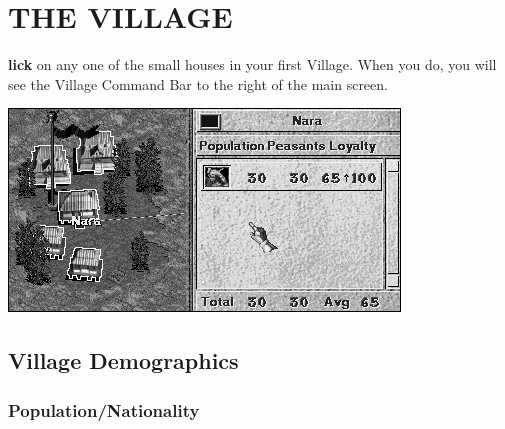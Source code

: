 
\chapter{\textsf{THE VILLAGE}}

\textbf{lick} on any one of the small houses in your first Village. When you do, you will see the Village Command Bar to the right of the main screen.

\begin{center}
    \includegraphics[width=0.9\linewidth]{Ivillage} %
\end{center}

\section{\textsf{Village Demographics}}


\subsection{\textsf{Population/Nationality}}

